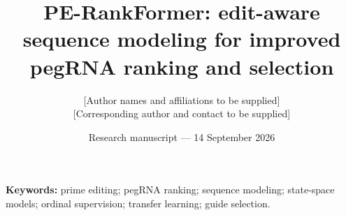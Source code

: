 \documentclass[11pt]{article}
\title{PE-RankFormer: edit-aware sequence modeling for improved pegRNA ranking and selection}
\author{[Author names and affiliations to be supplied]\\{}[Corresponding author and contact to be supplied]}
\date{Research manuscript --- 14 September 2026}
\begin{document}
\maketitle

\noindent\textbf{Keywords:} prime editing; pegRNA ranking; sequence modeling; state-space models; ordinal supervision; transfer learning; guide selection.





\begingroup\small


\endgroup
\clearpage
\appendix
\renewcommand{\thesection}{S\arabic{section}}
\setcounter{table}{0}
\setcounter{figure}{0}
\renewcommand{\thetable}{S\arabic{table}}
\renewcommand{\thefigure}{S\arabic{figure}}

\end{document}
